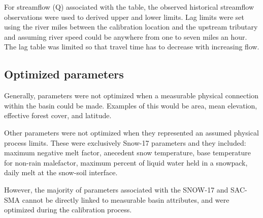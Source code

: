 \documentclass{agujournal2019}
\begin{document}
For streamflow (Q) associated with the table, the observed historical streamflow observations were used to derived upper and lower limits. 
 Lag limits were set using the river miles between the calibration location and the upstream tributary and assuming river speed could be anywhere from one to seven miles an hour. The lag table was limited so that travel time has to decrease with increasing flow.

 \subsection{Optimized parameters}

Generally, parameters were not optimized when a measurable physical connection within the basin could be made. Examples of this would be area, mean elevation, effective forest cover, and latitude. 

Other parameters were not optimized when they represented an assumed physical process limits. These were exclusively Snow-17 parameters and they included:  maximum negative melt factor, anecedent snow temperature, base temperature for non-rain malefactor, maximum percent of liquid water held in a snowpack, daily melt at the snow-soil interface. 

However, the majority of parameters associated with the SNOW-17 and SAC-SMA cannot be directly linked to measurable basin attributes, and were optimized during the calibration process. 
\end{document}
